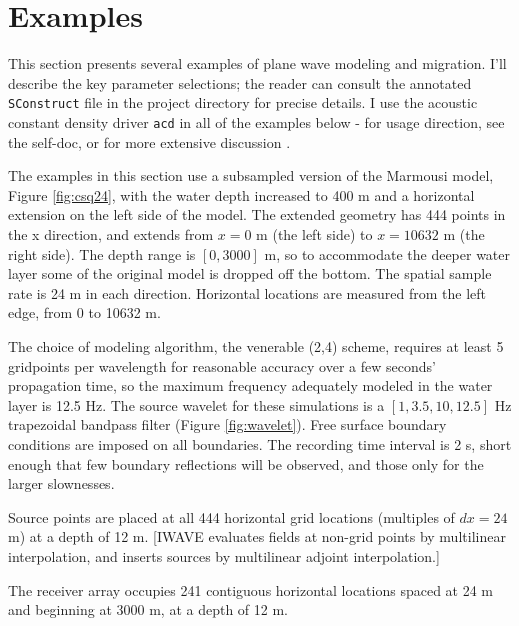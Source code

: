 \section{Examples}
This section presents several examples of plane wave modeling and migration. I'll describe the key parameter selections; the reader can consult the annotated {\tt SConstruct} file in the project directory for precise details.
I use the acoustic constant density driver {\tt acd} in all of the examples below - for usage direction, see the self-doc, or for more extensive discussion \cite[]{trip14:struct}. 

The examples in this section use a subsampled version of the Marmousi model, Figure \ref{fig:csq24}, with the water depth increased to 400 m and a horizontal extension on the left side of the model. The extended geometry has 444 points in the x direction, and extends from $x=0$ m (the left side) to $x=10632$ m (the right side). The depth range is $[0,3000]$ m, so to accommodate the deeper water layer some of the original model is dropped off the bottom. The spatial sample rate is 24 m in each direction. Horizontal locations are measured from the left edge, from 0 to 10632 m. 


The choice of modeling algorithm, the venerable (2,4) scheme, requires at least 5 gridpoints per wavelength for reasonable accuracy over a few seconds' propagation time, so the maximum frequency adequately modeled in the water layer is 12.5 Hz. The source wavelet for these simulations is a $[1,3.5,10,12.5]$ Hz trapezoidal bandpass filter (Figure \ref{fig:wavelet}). Free surface boundary conditions are imposed on all boundaries. The recording time interval is 2 s, short enough that few boundary reflections will be observed, and those only for the larger slownesses.


Source points are placed at all 444 horizontal grid locations (multiples of $dx=24$ m) at a depth of 12 m. [IWAVE evaluates fields at non-grid points by multilinear interpolation, and inserts sources by multilinear adjoint interpolation.]  

The receiver array occupies 241 contiguous horizontal locations spaced at 24 m and beginning at 3000 m, at a depth of 12 m.

